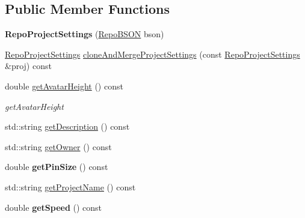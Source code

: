 \subsection*{Public Member Functions}
\begin{DoxyCompactItemize}
\item 
\hypertarget{classrepo_1_1core_1_1model_1_1_repo_project_settings_a1d6a75f7862fbc59f93e29970dc04a58}{}{\bfseries Repo\+Project\+Settings} (\hyperlink{classrepo_1_1core_1_1model_1_1_repo_b_s_o_n}{Repo\+B\+S\+O\+N} bson)\label{classrepo_1_1core_1_1model_1_1_repo_project_settings_a1d6a75f7862fbc59f93e29970dc04a58}

\item 
\hyperlink{classrepo_1_1core_1_1model_1_1_repo_project_settings}{Repo\+Project\+Settings} \hyperlink{classrepo_1_1core_1_1model_1_1_repo_project_settings_a8b06243dafac7759d776c62b21d84516}{clone\+And\+Merge\+Project\+Settings} (const \hyperlink{classrepo_1_1core_1_1model_1_1_repo_project_settings}{Repo\+Project\+Settings} \&proj) const 
\item 
double \hyperlink{classrepo_1_1core_1_1model_1_1_repo_project_settings_af0bc7f83f4a7cfe072684ba524016060}{get\+Avatar\+Height} () const 
\begin{DoxyCompactList}\small\item\em get\+Avatar\+Height \end{DoxyCompactList}\item 
std\+::string \hyperlink{classrepo_1_1core_1_1model_1_1_repo_project_settings_a38501a07d34deb1b79e2bbf82f1cd0c2}{get\+Description} () const 
\item 
std\+::string \hyperlink{classrepo_1_1core_1_1model_1_1_repo_project_settings_a913555bb08814a0a6d19468f06135167}{get\+Owner} () const 
\item 
\hypertarget{classrepo_1_1core_1_1model_1_1_repo_project_settings_a346e97eeca7e2240636d38c6c782dc84}{}double {\bfseries get\+Pin\+Size} () const \label{classrepo_1_1core_1_1model_1_1_repo_project_settings_a346e97eeca7e2240636d38c6c782dc84}

\item 
std\+::string \hyperlink{classrepo_1_1core_1_1model_1_1_repo_project_settings_a4eb1f1aef8f2bd7b92bd0e01e8602731}{get\+Project\+Name} () const 
\item 
\hypertarget{classrepo_1_1core_1_1model_1_1_repo_project_settings_ababb3684d12b3a9ad43a2fa066409a7e}{}double {\bfseries get\+Speed} () const \label{classrepo_1_1core_1_1model_1_1_repo_project_settings_ababb3684d12b3a9ad43a2fa066409a7e}


\end{DoxyCompactItemize}
